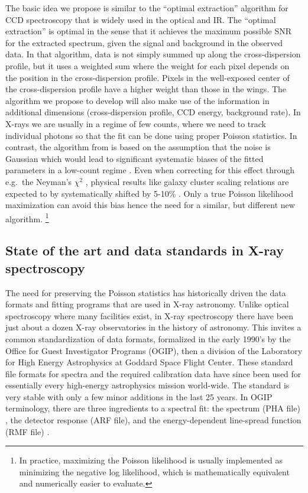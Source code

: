 \documentclass[fleqn,12pt,onecolumn]{SelfArx} %
\begin{document}
The basic idea we propose is similar to the ``optimal extraction'' algorithm for CCD spectroscopy \cite{1986PASP...98..609H} that is widely used in the optical and IR. The ``optimal extraction'' is optimal in the sense that it achieves the maximum possible SNR for the extracted spectrum, given the signal and background in the observed data. In that algorithm, data is not simply summed up along the cross-dispersion profile, but it uses a weighted sum where the weight for each pixel depends on the position in the cross-dispersion profile. Pixels in the well-exposed center of the cross-dispersion profile have a higher weight than those in the wings. The algorithm we propose to develop will also make use of the information in additional dimensions (cross-dispersion profile, CCD energy, background rate). In X-rays we are usually in a regime of few counts, where we need to track individual photons so that the fit can be done using proper Poisson statistics. In contrast, the algorithm from \cite{1986PASP...98..609H} is based on the assumption that the noise is Gaussian which would lead to significant systematic biases of the fitted parameters in a low-count regime \cite{1989ApJ...342.1207N,1996NIMPA.372..289J,1999ApJ...518..380M,2001NIMPA.457..384H}. Even when correcting for this effect through e.g.\ the Neyman's $\chi^2$ \cite{1999ApJ...518..380M}, physical results like galaxy cluster scaling relations are expected to by systematically shifted by 5-10\% \cite{2009ApJ...693..822H}. Only a true Poisson likelihood maximization can avoid this bias \cite{1979ApJ...228..939C,2007A&A...468..501A} hence the need for a similar, but different new algorithm. \footnote{In practice, maximizing the Poisson likelihood is usually implemented as minimizing the negative log likelihood, which is mathematically equivalent and numerically easier to evaluate.}


\subsection{State of the art and data standards in X-ray spectroscopy}
The need for preserving the Poisson statistics has historically driven the data formats and fitting programs that are used in X-ray astronomy.
Unlike optical spectroscopy where many facilities exist, in X-ray spectroscopy there have been just about a dozen X-ray observatories in the history of astronomy. This invites a common standardization of data formats, formalized in the early 1990's by the
Office for Guest Investigator Programs (OGIP), then a division of the
Laboratory for High Energy Astrophysics at Goddard Space Flight Center. These standard file formats for spectra and the required calibration data have
since been used for essentially every high-energy astrophysics mission
world-wide.
The standard is very stable with only a few minor additions in the last 25 years. In OGIP terminology, there are three ingredients to a spectral fit: the spectrum (PHA file) \cite{PHA}, the detector response (ARF file), and the energy-dependent line-spread function (RMF file) \cite{RMFARF}.
\end{document}
